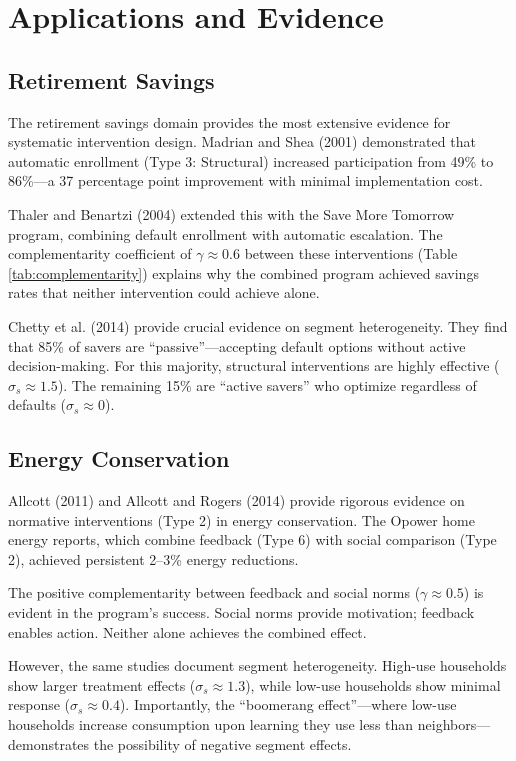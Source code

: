 \documentclass[12pt,a4paper]{article}
\begin{document}
\section{Applications and Evidence}

\subsection{Retirement Savings}

The retirement savings domain provides the most extensive evidence for systematic intervention design. Madrian and Shea (2001) demonstrated that automatic enrollment (Type 3: Structural) increased participation from 49\% to 86\%---a 37 percentage point improvement with minimal implementation cost.

Thaler and Benartzi (2004) extended this with the Save More Tomorrow program, combining default enrollment with automatic escalation. The complementarity coefficient of $\gamma \approx 0.6$ between these interventions (Table \ref{tab:complementarity}) explains why the combined program achieved savings rates that neither intervention could achieve alone.

Chetty et al. (2014) provide crucial evidence on segment heterogeneity. They find that 85\% of savers are ``passive''---accepting default options without active decision-making. For this majority, structural interventions are highly effective ($\sigma_s \approx 1.5$). The remaining 15\% are ``active savers'' who optimize regardless of defaults ($\sigma_s \approx 0$).

\subsection{Energy Conservation}

Allcott (2011) and Allcott and Rogers (2014) provide rigorous evidence on normative interventions (Type 2) in energy conservation. The Opower home energy reports, which combine feedback (Type 6) with social comparison (Type 2), achieved persistent 2--3\% energy reductions.

The positive complementarity between feedback and social norms ($\gamma \approx 0.5$) is evident in the program's success. Social norms provide motivation; feedback enables action. Neither alone achieves the combined effect.

However, the same studies document segment heterogeneity. High-use households show larger treatment effects ($\sigma_s \approx 1.3$), while low-use households show minimal response ($\sigma_s \approx 0.4$). Importantly, the ``boomerang effect''---where low-use households increase consumption upon learning they use less than neighbors---demonstrates the possibility of negative segment effects.
\end{document}
